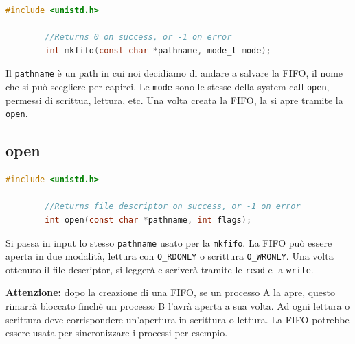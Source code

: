 \documentclass[a4paper, 12pt]{book}
\begin{document}
    \begin{lstlisting}[language=C]
        #include <unistd.h>

        //Returns 0 on success, or -1 on error 
        int mkfifo(const char *pathname, mode_t mode);
    \end{lstlisting}
    Il \verb|pathname| è un path in cui noi decidiamo di 
    andare a salvare la FIFO, il nome che si può scegliere
    per capirci. Le \verb|mode| sono le stesse della 
    system call \verb|open|, permessi di scrittua, lettura, etc.
    Una volta creata la FIFO, la si apre tramite la \verb|open|.

    \subsection{open}

    \begin{lstlisting}[language=C]
        #include <unistd.h>

        //Returns file descriptor on success, or -1 on error 
        int open(const char *pathname, int flags);
    \end{lstlisting}
    Si passa in input lo stesso \verb|pathname| usato per 
    la \verb|mkfifo|. La FIFO può essere aperta in due 
    modalità, lettura con \verb|O_RDONLY| o scrittura 
    \verb|O_WRONLY|. Una volta ottenuto il file descriptor, 
    si leggerà e scriverà tramite le \verb|read| e la 
    \verb|write|.

    \textbf{Attenzione:} dopo la creazione di una FIFO, se un processo 
    A la apre, questo rimarrà bloccato finchè un processo 
    B l'avrà aperta a sua volta. Ad ogni lettura o scrittura 
    deve corrispondere un'apertura in scrittura o lettura.
    La FIFO potrebbe essere usata per sincronizzare i processi 
    per esempio.
\end{document}
